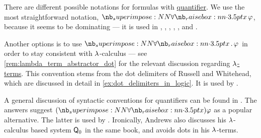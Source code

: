\begin{remark}\label{rem:notation_for_quantifiers}
  There are different possible notations for formulas with \hyperref[def:predicate_logic_alphabet/quantifiers]{quantifier}. We use the most straightforward notation, \( \qforall x \varphi \), because it seems to be dominating --- it is used in
  \cite[ch. 2]{Hinman2005Logic},
  \cite[ch. II]{Kleene2002Logic},
  \cite[ch. IV]{Smullyan1995FOL},
  \cite[\S I.9]{КолмогоровДрагалин2006Логика},
  \cite[def. 2.1.6]{Герасимов2011Вычислимость},
  \cite[ch. 3]{ШеньВерещагин2017ЯзыкиИИсчисления} and
  \cite[ch. II]{Эдельман1975Логика}.

  Another options is to use \( \quantifier* \synforall x \varphi \) in order to stay consistent with \( {\mathrm \lambda} \)-calculus --- see \cref{rem:lambda_term_abstractor_dot} for the relevant discussion regarding \hyperref[def:lambda_term]{\( {\mathrm \lambda} \)-terms}. This convention stems from the dot delimiters of Russell and Whitehead, which are discussed in detail in \cref{ex:dot_delimiters_in_logic}. It is used by .

  A general discussion of syntactic conventions for quantifiers can be found in \cite{MathSE:standards_for_quantifier_notation}. The answers suggest \( (\synforall x) \varphi \) as a popular alternative. The latter is used by . Ironically, Andrews also discusses his \( {\mathrm \lambda} \)-calculus based system \hyperref[rem:simply_typed_hol]{\( \textsf{Q}_0 \)} in the same book, and avoids dots in his \( {\mathrm \lambda} \)-terms.
\end{remark}

